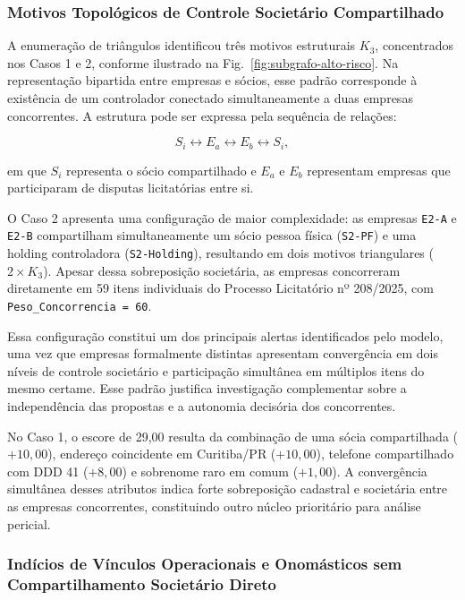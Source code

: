 \subsubsection{Motivos Topológicos de Controle Societário Compartilhado}

A enumeração de triângulos identificou três motivos estruturais $K_3$, concentrados nos Casos 1 e 2, conforme ilustrado na Fig.~\ref{fig:subgrafo-alto-risco}. Na representação bipartida entre empresas e sócios, esse padrão corresponde à existência de um controlador conectado simultaneamente a duas empresas concorrentes. A estrutura pode ser expressa pela sequência de relações:

\begin{equation}
  S_i \longleftrightarrow E_a \longleftrightarrow E_b \longleftrightarrow S_i,
  \label{eq:motivo_k3}
\end{equation}

em que $S_i$ representa o sócio compartilhado e $E_a$ e $E_b$ representam empresas que participaram de disputas licitatórias entre si.

O Caso 2 apresenta uma configuração de maior complexidade: as empresas \texttt{E2-A} e \texttt{E2-B} compartilham simultaneamente um sócio pessoa física (\texttt{S2-PF}) e uma holding controladora (\texttt{S2-Holding}), resultando em dois motivos triangulares ($2 \times K_3$). Apesar dessa sobreposição societária, as empresas concorreram diretamente em 59 itens individuais do Processo Licitatório nº 208/2025, com
\texttt{Peso\_Concorrencia = 60}.

Essa configuração constitui um dos principais alertas identificados pelo modelo, uma vez que empresas formalmente distintas apresentam convergência em dois níveis de controle societário e participação simultânea em múltiplos itens do mesmo certame. Esse padrão justifica investigação complementar sobre a independência das propostas e a autonomia decisória dos concorrentes.

No Caso 1, o escore de 29{,}00 resulta da combinação de uma sócia compartilhada ($+10{,}00$), endereço coincidente em Curitiba/PR ($+10{,}00$), telefone compartilhado com DDD 41 ($+8{,}00$) e sobrenome raro em comum ($+1{,}00$). A convergência simultânea desses atributos indica forte sobreposição cadastral e societária entre as empresas concorrentes, constituindo outro núcleo prioritário para análise pericial.

\subsubsection{Indícios de Vínculos Operacionais e Onomásticos
sem Compartilhamento Societário Direto}

